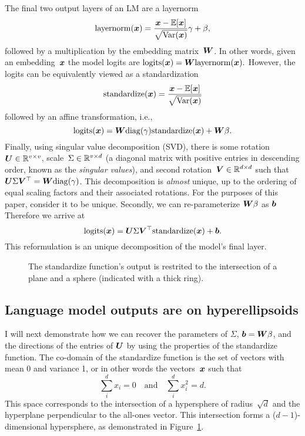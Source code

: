 \documentclass{article}
\newcommand\layernorm{\mathrm{layernorm}}
\newcommand\standardize{\mathrm{standardize}}
\newcommand\logits{\mathrm{logits}}
\newcommand\diag{\mathrm{diag}}
\begin{document}
The final two output layers of an LM are a layernorm
\[\layernorm(\vx)=\frac{\vx-\E[\vx]}{\sqrt{\Var(\vx)}}\gamma + \beta,\]
followed by a multiplication by the embedding matrix~\({\bm{W}}\). 
In other words, given an embedding~\({\bm{x}}\)
the model logits are \(\logits(\vx)=\mW\layernorm(\vx).\)
However, the logits can be equivalently viewed as a standardization
\begin{equation}
  \standardize(\vx)=\frac{\vx-\E[\vx]}{\sqrt{\Var(\vx)}}
  \label{eq:standardize}
\end{equation}
followed by an affine transformation, i.e.,
\[\logits(\vx)=\mW\diag(\gamma)\standardize(\vx) + \mW\beta.\]
Finally, using singular value decomposition (SVD),
there is some rotation~\({\bm{U}}\in\mathbb{R}^{v\times v}\),
scale~\(\Sigma\in\mathbb{R}^{v\times d}\) 
(a diagonal matrix with positive entries in descending order, known as the \emph{singular values}),
and second rotation~\({\bm{V}}\in\mathbb{R}^{d\times d}\)
such that \(\mU\Sigma\mV^\top=\mW\diag(\gamma)\).
This decomposition is \emph{almost} unique,
up to the ordering of equal scaling factors and their associated rotations.
For the purposes of this paper, consider it to be unique.
Secondly, we can re-parameterize \({\bm{W}}\beta\) as \({\bm{b}}\)
Therefore we arrive at 
\[\logits(\vx)=\mU\Sigma\mV^\top\standardize(\vx)+\vb.\]
This reformulation is an unique decomposition of the model's final layer.

\begin{figure}
  \centering
  \small
  
  \caption{The standardize function's output is restrited to the intersection of a plane and a sphere (indicated with a thick ring).}
  \label{fig:standardize}
\end{figure}

\subsection{Language model outputs are on hyperellipsoids}

I will next demonstrate how we can recover the parameters of \(\Sigma\), 
\({\bm{b}}={\bm{W}}\beta\), and the directions of the entries of \({\bm{U}}\)
by using the properties of the standardize function.
The co-domain of the standardize function
is the set of vectors with mean 0 and variance 1,
or in other words the vectors~\({\bm{x}}\) such that 
\[\sum_i^dx_i=0\quad\text{and}\quad \sum_i^dx_i^2=d.\]
This space corresponds to the intersection of a hypersphere of radius~\(\sqrt{d}\)
and the hyperplane perpendicular to the all-ones vector.
This intersection forms a (\(d-1\))-dimensional hypersphere,
as demonstrated in Figure~\ref{fig:standardize}.
\end{document}
